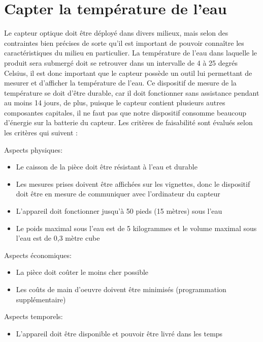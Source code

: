 

\section{Capter la température de l'eau}
\label{s:faisab_temp_eau}
Le capteur optique doit être déployé dans divers milieux, mais selon des contraintes bien précises de sorte qu’il est important de pouvoir connaître les caractéristiques du milieu en particulier. La température de l’eau dans laquelle le produit sera submergé doit se retrouver dans un intervalle de 4 à 25 degrés Celsius, il est donc important que le capteur possède un outil lui permettant de mesurer et d’afficher la température de l’eau. Ce dispositif de mesure de la température se doit d’être durable, car il doit fonctionner sans assistance pendant au moins 14 jours, de plus, puisque le capteur contient plusieurs autres composantes capitales, il ne faut pas que notre dispositif consomme beaucoup d’énergie sur la batterie du capteur. Les critères de faisabilité sont évalués selon les critères qui suivent :

Aspects physiques:
\begin{itemize}
	\item Le caisson de la pièce doit être résistant à l’eau et durable
	\item Les mesures prises doivent être affichées sur les vignettes, donc le dispositif doit être         
	en mesure de communiquer avec l’ordinateur du capteur 
	\item L’appareil doit fonctionner jusqu’à 50 pieds (15 mètres) sous l’eau
	\item Le poids maximal sous l’eau est de 5 kilogrammes et le volume maximal sous l’eau est                  
	de 0,3 mètre cube
\end{itemize}

Aspects économiques:
\begin{itemize}
	\item La pièce doit coûter le moins cher possible
	\item Les coûts de main d’oeuvre doivent être minimisés (programmation supplémentaire) 
\end{itemize}

Aspects temporels:
\begin{itemize}
	\item L’appareil doit être disponible et pouvoir être livré dans les temps 
\end{itemize}

